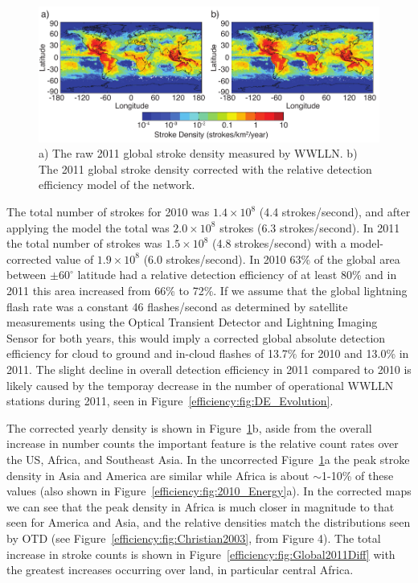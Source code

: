 \begin{figure}[ht!]
   \centering
\noindent\includegraphics[scale=1]{efficiency/Figures/2012RS005049-p14.pdf}
   \caption{a) The raw 2011 global stroke density measured by WWLLN.
   b) The 2011 global stroke density corrected with the relative detection efficiency model of the network.}
   \label{efficiency:fig:Global2011}
\end{figure}

The total number of strokes for 2010 was $1.4\times10^8$ (4.4 strokes/second), and after applying the model the total was $2.0\times10^8$ strokes (6.3 strokes/second).
In 2011 the total number of strokes was $1.5\times10^8$ (4.8 strokes/second) with a model-corrected value of $1.9\times10^8$ (6.0 strokes/second).
In 2010 63\% of the global area between $\pm60^\circ$ latitude had a relative detection efficiency of at least 80\% and in 2011 this area increased from 66\% to 72\%.
If we assume that the global lightning flash rate was a constant 46 flashes/second as determined by satellite measurements using the Optical Transient Detector and Lightning Imaging Sensor \citep{Cecil2011, Christian2003} for both years, this would imply a corrected global absolute detection efficiency for cloud to ground and in-cloud flashes of 13.7\% for 2010 and 13.0\% in 2011.
The slight decline in overall detection efficiency in 2011 compared to 2010 is likely caused by the temporay decrease in the number of operational WWLLN stations during 2011, seen in Figure~\ref{efficiency:fig:DE_Evolution}.

The corrected yearly density is shown in Figure~\ref{efficiency:fig:Global2011}b, aside from the overall increase in number counts the important feature is the relative count rates over the US, Africa, and Southeast Asia.
In the uncorrected Figure~\ref{efficiency:fig:Global2011}a the peak stroke density in Asia and America are similar while Africa is about $\sim$1-10\% of these values (also shown in Figure~\ref{efficiency:fig:2010_Energy}a).
In the corrected maps we can see that the peak density in Africa is much closer in magnitude to that seen for America and Asia, and the relative densities match the distributions seen by OTD (see Figure~\ref{efficiency:fig:Christian2003}, from \citet{Christian2003} Figure 4).
The total increase in stroke counts is shown in Figure~\ref{efficiency:fig:Global2011Diff} with the greatest increases occurring over land, in particular central Africa.

